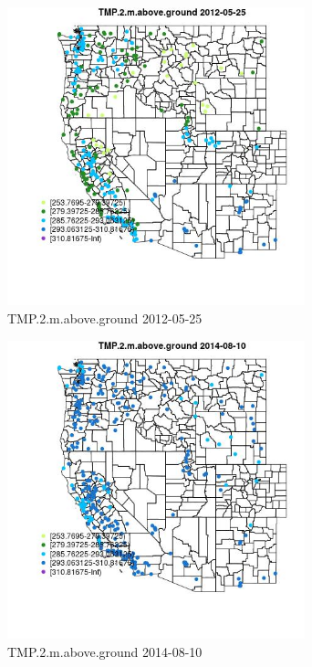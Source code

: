 \begin{figure} 
\centering  
\includegraphics[width=0.77\textwidth]{Code_Outputs/Report_ML_input_PM25_Step4_part_e_de_duplicated_aves_compiled_2019-05-18wNAs_MapObsTMP2maboveground2012-05-25.jpg} 
\caption{\label{fig:Report_ML_input_PM25_Step4_part_e_de_duplicated_aves_compiled_2019-05-18wNAsMapObsTMP2maboveground2012-05-25}TMP.2.m.above.ground 2012-05-25} 
\end{figure} 
 

\begin{figure} 
\centering  
\includegraphics[width=0.77\textwidth]{Code_Outputs/Report_ML_input_PM25_Step4_part_e_de_duplicated_aves_compiled_2019-05-18wNAs_MapObsTMP2maboveground2014-08-10.jpg} 
\caption{\label{fig:Report_ML_input_PM25_Step4_part_e_de_duplicated_aves_compiled_2019-05-18wNAsMapObsTMP2maboveground2014-08-10}TMP.2.m.above.ground 2014-08-10} 
\end{figure} 
 

